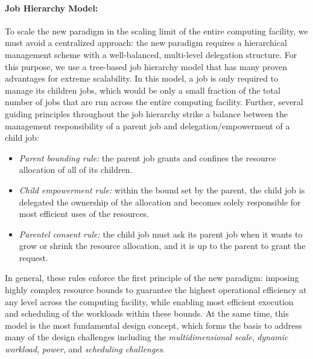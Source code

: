 \documentclass{article}
\begin{document}
\paragraph{Job Hierarchy Model:}
To scale the new paradigm in the scaling limit of the entire computing facility,
we must avoid a centralized approach: the new paradigm requires a hierarchical management scheme 
with a well-balanced, multi-level delegation structure. 
For this purpose, we use a tree-based job hierarchy model that has many proven advantages
for extreme scalability. 
In this model, a job is only required to manage its children jobs,
which would be only a small fraction of the total number of jobs that are run
across the entire computing facility. Further, several guiding principles
throughout the job hierarchy strike a balance between the management
responsibility of a parent job and delegation/empowerment of a child job:
\begin{itemize}
\item{\sl Parent bounding rule:} the parent job grants and confines
     the resource allocation of all of its children.
\item{\sl Child empowerment rule:} within the bound set by the parent,
     the child job is delegated the ownership of the allocation
     and becomes solely responsible for most efficient uses of the resources.
\item{\sl Parentel consent rule:} the child job must ask its parent job
     when it wants to grow or shrink the resource allocation, 
     and it is up to the parent to grant the request.                   
\end{itemize}
In general, these rules enforce the first principle of the new paradigm: 
imposing highly complex resource bounds to guarantee the highest operational efficiency
at any level across the computing facility, while enabling most efficient execution
and scheduling of the workloads within these bounds.
At the same time, this model is the most fundamental design concept,
which forms the basis to address many of the design challenges including 
the {\sl multidimensional scale}, {\sl dynamic workload}, {\sl power}, and
{\sl scheduling challenges}. 
\end{document}

